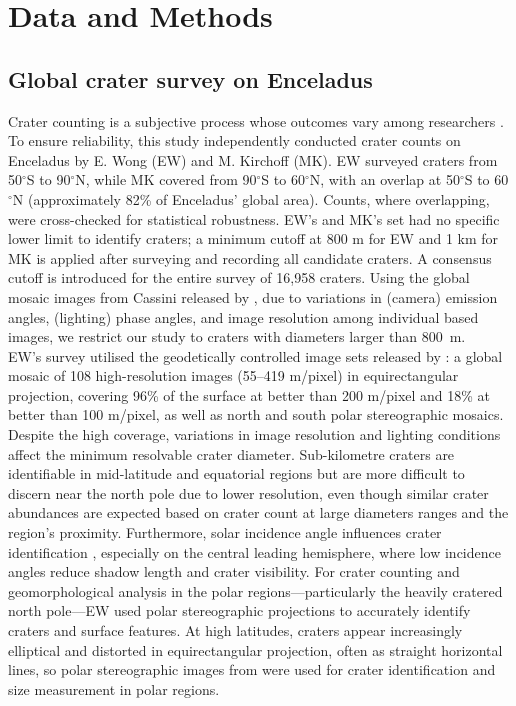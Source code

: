 \documentclass[preprint,11pt,3p,times,authoryear]{elsarticle}
\begin{document}
\section{Data and Methods}
\label{sec:data}

\subsection{Global crater survey on Enceladus}
\label{sub:survey}
Crater counting is a subjective process whose outcomes vary among researchers \citep{Robbins2014}. To ensure reliability, this study independently conducted crater counts on Enceladus by E. Wong (EW) and M. Kirchoff (MK). EW surveyed craters from 50$^\circ$S to 90$^\circ$N, while MK covered from 90$^\circ$S to 60$^\circ$N, with an overlap at 50$^\circ$S to 60$^\circ$N (approximately 82\% of Enceladus' global area). Counts, where overlapping, were cross-checked for statistical robustness. EW’s and MK’s set had no specific lower limit to identify craters; a minimum cutoff at 800 m for EW and 1 km for MK is applied after surveying and recording all candidate craters. A consensus cutoff is introduced for the entire survey of 16,958 craters. Using the global mosaic images from Cassini released by \citet{Bland2018}, due to variations in (camera) emission angles, (lighting) phase angles, and image resolution among individual based images, we restrict our study to craters with diameters larger than 800~m. \\

EW’s survey utilised the geodetically controlled image sets released by \citet{Bland2018}: a global mosaic of 108 high-resolution images (55–419 m/pixel) in equirectangular projection, covering 96\% of the surface at better than 200 m/pixel and 18\% at better than 100 m/pixel, as well as north and south polar stereographic mosaics. Despite the high coverage, variations in image resolution and lighting conditions affect the minimum resolvable crater diameter. Sub-kilometre craters are identifiable in mid-latitude and equatorial regions but are more difficult to discern near the north pole due to lower resolution, even though similar crater abundances are expected based on crater count at large diameters ranges and the region's proximity. Furthermore, solar incidence angle influences crater identification \citep{Ostrach2011, Robbins2025}, especially on the central leading hemisphere, where low incidence angles reduce shadow length and crater visibility. For crater counting and geomorphological analysis in the polar regions—particularly the heavily cratered north pole—EW used polar stereographic projections to accurately identify craters and surface features. At high latitudes, craters appear increasingly elliptical and distorted in equirectangular projection, often as straight horizontal lines, so polar stereographic images from \citet{Bland2018} were used for crater identification and size measurement in polar regions.\\
\end{document}
